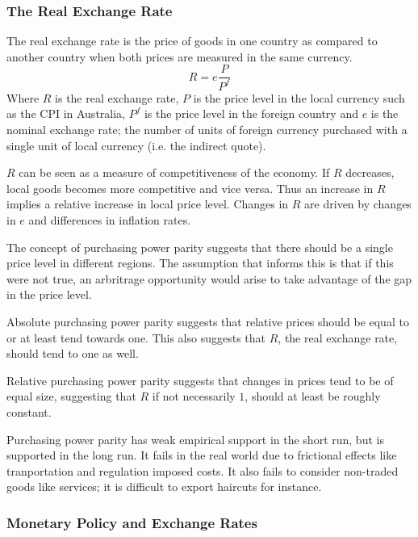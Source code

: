 \documentclass[12pt]{report}
\begin{document}
\begin{flushleft}
\subsubsection*{The Real Exchange Rate}

The real exchange rate is the price of goods in one country as compared to
another country when both prices are measured in the same currency.
\[R = e\frac{P}{P^f}\]
Where \(R\) is the real exchange rate, \(P\) is the price level in the local
currency such as the CPI in Australia, \(P^f\) is the price level in the
foreign country and \(e\) is the nominal exchange rate; the number of units of
foreign currency purchased with a single unit of local currency (i.e. the
indirect quote). \par
\(R\) can be seen as a measure of competitiveness of the economy. If \(R\)
decreases, local goods becomes more competitive and vice versa. Thus an
increase in \(R\) implies a relative increase in local price level. Changes
in \(R\) are driven by changes in \(e\) and differences in inflation rates.
\par
The concept of purchasing power parity suggests that there should be a single
price level in different regions. The assumption that informs this is that if
this were not true, an arbritrage opportunity would arise to take advantage
of the gap in the price level. \par
Absolute purchasing power parity suggests that relative prices should be equal
to or at least tend towards one. This also suggests that \(R\), the real
exchange rate, should tend to one as well. \par
Relative purchasing power parity suggests that changes in prices tend to be of
equal size, suggesting that \(R\) if not necessarily \(1\), should at least be
roughly constant. \par
Purchasing power parity has weak empirical support in the short run, but is
supported in the long run. It fails in the real world due to frictional effects
like tranportation and regulation imposed costs. It also fails to consider
non-traded goods like services; it is difficult to export haircuts for
instance.

\subsubsection*{Monetary Policy and Exchange Rates}


\end{flushleft}
\end{document}
